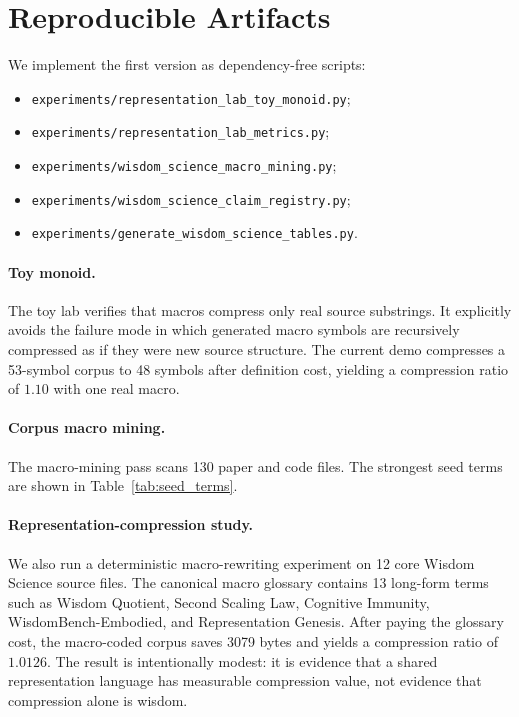\documentclass[11pt]{article}
\begin{document}
\section{Reproducible Artifacts}

We implement the first version as dependency-free scripts:
\begin{itemize}[leftmargin=*]
  \item \texttt{experiments/representation\_lab\_toy\_monoid.py};
  \item \texttt{experiments/representation\_lab\_metrics.py};
  \item \texttt{experiments/wisdom\_science\_macro\_mining.py};
  \item \texttt{experiments/wisdom\_science\_claim\_registry.py};
  \item \texttt{experiments/generate\_wisdom\_science\_tables.py}.
\end{itemize}

\paragraph{Toy monoid.}
The toy lab verifies that macros compress only real source substrings.
It explicitly avoids the failure mode in which generated macro symbols are recursively compressed as if they were new source structure.
The current demo compresses a 53-symbol corpus to 48 symbols after definition cost, yielding a compression ratio of $1.10$ with one real macro.

\paragraph{Corpus macro mining.}
The macro-mining pass scans 130 paper and code files.
The strongest seed terms are shown in Table~\ref{tab:seed_terms}.

\begin{table}[t]
\centering
\small
\caption{Top seed terms from the Wisdom Science corpus. Counts and document frequencies are generated from \texttt{macro\_registry\_v0.json}.}
\label{tab:seed_terms}

\end{table}

\paragraph{Representation-compression study.}
We also run a deterministic macro-rewriting experiment on 12 core Wisdom Science source files.
The canonical macro glossary contains 13 long-form terms such as Wisdom Quotient, Second Scaling Law, Cognitive Immunity, WisdomBench-Embodied, and Representation Genesis.
After paying the glossary cost, the macro-coded corpus saves 3079 bytes and yields a compression ratio of $1.0126$.
The result is intentionally modest: it is evidence that a shared representation language has measurable compression value, not evidence that compression alone is wisdom.
\end{document}
